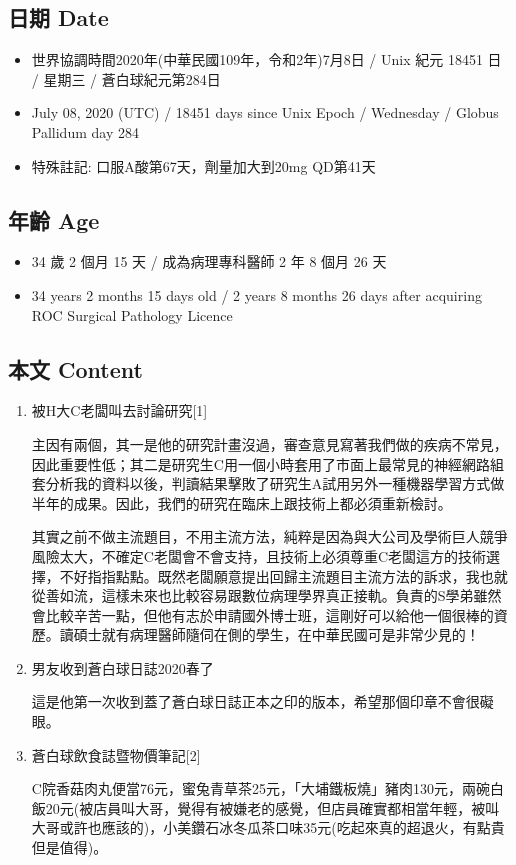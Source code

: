 \documentclass[a5paper, 11pt
]{book}
\providecommand{\tightlist}{%
  \setlength{\itemsep}{0pt}\setlength{\parskip}{0pt}}
\begin{document}
\hypertarget{ux65e5ux671f-date-37}{%
\subsection{日期 Date}\label{ux65e5ux671f-date-37}}

\begin{itemize}
\tightlist
\item
  世界協調時間2020年(中華民國109年，令和2年)7月8日 / Unix 紀元 18451 日
  / 星期三 / 蒼白球紀元第284日
\item
  July 08, 2020 (UTC) / 18451 days since Unix Epoch / Wednesday / Globus
  Pallidum day 284
\item
  特殊註記: 口服A酸第67天，劑量加大到20mg QD第41天
\end{itemize}

\hypertarget{ux5e74ux9f61-age-37}{%
\subsection{年齡 Age}\label{ux5e74ux9f61-age-37}}

\begin{itemize}
\tightlist
\item
  34 歲 2 個月 15 天 / 成為病理專科醫師 2 年 8 個月 26 天
\item
  34 years 2 months 15 days old / 2 years 8 months 26 days after
  acquiring ROC Surgical Pathology Licence
\end{itemize}

\hypertarget{ux672cux6587-content-37}{%
\subsection{本文 Content}\label{ux672cux6587-content-37}}

\begin{enumerate}
\def\labelenumi{\arabic{enumi}.}
\item
  被H大C老闆叫去討論研究{[}1{]}

  主因有兩個，其一是他的研究計畫沒過，審查意見寫著我們做的疾病不常見，因此重要性低；其二是研究生C用一個小時套用了市面上最常見的神經網路組套分析我的資料以後，判讀結果擊敗了研究生A試用另外一種機器學習方式做半年的成果。因此，我們的研究在臨床上跟技術上都必須重新檢討。

  其實之前不做主流題目，不用主流方法，純粹是因為與大公司及學術巨人競爭風險太大，不確定C老闆會不會支持，且技術上必須尊重C老闆這方的技術選擇，不好指指點點。既然老闆願意提出回歸主流題目主流方法的訴求，我也就從善如流，這樣未來也比較容易跟數位病理學界真正接軌。負責的S學弟雖然會比較辛苦一點，但他有志於申請國外博士班，這剛好可以給他一個很棒的資歷。讀碩士就有病理醫師隨伺在側的學生，在中華民國可是非常少見的！
\item
  男友收到蒼白球日誌2020春了

  這是他第一次收到蓋了蒼白球日誌正本之印的版本，希望那個印章不會很礙眼。
\item
  蒼白球飲食誌暨物價筆記{[}2{]}

  C院香菇肉丸便當76元，蜜兔青草茶25元，「大埔鐵板燒」豬肉130元，兩碗白飯20元(被店員叫大哥，覺得有被嫌老的感覺，但店員確實都相當年輕，被叫大哥或許也應該的)，小美鑽石冰冬瓜茶口味35元(吃起來真的超退火，有點貴但是值得)。
\end{enumerate}
\end{document}
